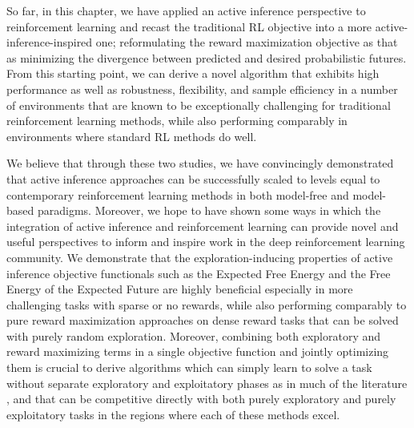 So far, in this chapter, we have applied an active inference perspective to reinforcement learning and recast the traditional RL objective into a more active-inference-inspired one; reformulating the reward maximization objective as that as minimizing the divergence between predicted and desired probabilistic futures. From this starting point, we can derive a novel algorithm that exhibits high performance as well as robustness, flexibility, and sample efficiency in a number of environments that are known to be exceptionally challenging for traditional reinforcement learning methods, while also performing comparably in environments where standard RL methods do well.

We believe that through these two studies, we have convincingly demonstrated that active inference approaches can be successfully scaled to levels equal to contemporary reinforcement learning methods in both model-free and model-based paradigms. Moreover, we hope to have shown some ways in which the integration of active inference and reinforcement learning can provide novel and useful perspectives to inform and inspire work in the deep reinforcement learning community. We demonstrate that the exploration-inducing properties of active inference objective functionals such as the Expected Free Energy and the Free Energy of the Expected Future are highly beneficial especially in more challenging tasks with sparse or no rewards, while also performing comparably to pure reward maximization approaches on dense reward tasks that can be solved with purely random exploration. Moreover, combining both exploratory and reward maximizing terms in a single objective function and jointly optimizing them is crucial to derive algorithms which can simply learn to solve a task without separate exploratory and exploitatory phases as in much of the literature \citep{shyam_model-based_2019}, and that can be competitive directly with both purely exploratory and purely exploitatory tasks in the regions where each of these methods excel. 

